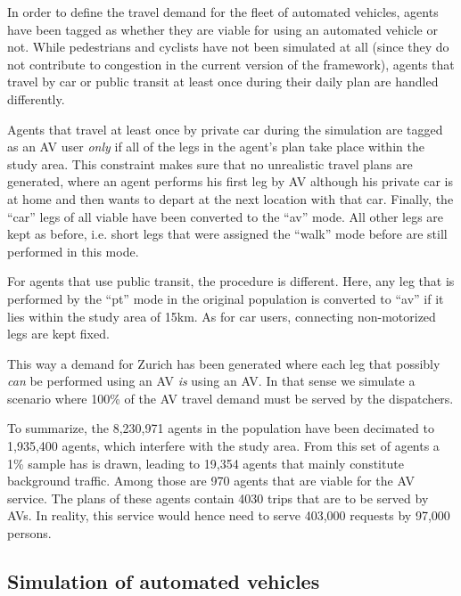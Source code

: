 In order to define the travel demand for the fleet of automated vehicles, agents
have been tagged as whether they are viable for using an automated vehicle or not.
While pedestrians and cyclists have not been simulated at all (since they do not
contribute to congestion in the current version of the framework), agents that
travel by car or public transit at least once during their daily plan are
handled differently.

Agents that travel at least once by private car during the simulation are tagged
as an AV user \textit{only} if all of the legs in the agent's plan take place
within the study area. This constraint makes sure that no unrealistic travel
plans are generated, where an agent performs his first leg by AV although his
private car is at home and then wants to depart at the next location with that
car. Finally, the ``car'' legs of all viable have been converted to the ``av'' mode.
All other legs are kept as before, i.e. short legs that were assigned the ``walk''
mode before are still performed in this mode.

For agents that use public transit, the procedure is different. Here, any leg
that is performed by the ``pt'' mode in the original population is converted to ``av''
if it lies within the study area of 15km. As for car users, connecting non-motorized
legs are kept fixed.

This way a demand for Zurich has been generated where each leg that possibly
\textit{can} be performed using an AV \textit{is} using an AV. In that sense we
simulate a scenario where 100\% of the AV travel demand must be served by the
dispatchers.

To summarize, the 8,230,971 agents in the population have been decimated to
1,935,400 agents, which interfere with the study area. From this set of agents
a 1\% sample has is drawn, leading to 19,354 agents that mainly constitute
background traffic. Among those are 970 agents that are viable for the AV
service. The plans of these agents contain 4030 trips that are to be served by
AVs. In reality, this service would hence need to serve 403,000 requests by
97,000 persons.

\subsection{Simulation of automated vehicles}

